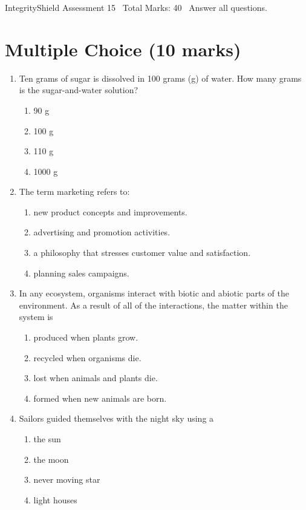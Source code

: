 \documentclass[12pt]{article}
\begin{document}
\begin{center}
IntegrityShield Assessment 15 \
Total Marks: 40 \
Answer all questions.
\end{center}

\section*{Multiple Choice (10 marks)}
\begin{enumerate}[label=\arabic*.]
\item Ten grams of sugar is dissolved in 100 grams (g) of water. How many grams is the sugar-and-water solution?
\begin{enumerate}[label=(\alph*)]
    \item 90 g
    \item 100 g
    \item 110 g
    \item 1000 g
\end{enumerate}
\item The term marketing refers to:
\begin{enumerate}[label=(\alph*)]
    \item new product concepts and improvements.
    \item advertising and promotion activities.
    \item a philosophy that stresses customer value and satisfaction.
    \item planning sales campaigns.
\end{enumerate}
\item In any ecosystem, organisms interact with biotic and abiotic parts of the environment. As a result of all of the interactions, the matter within the system is
\begin{enumerate}[label=(\alph*)]
    \item produced when plants grow.
    \item recycled when organisms die.
    \item lost when animals and plants die.
    \item formed when new animals are born.
\end{enumerate}
\item Sailors guided themselves with the night sky using a
\begin{enumerate}[label=(\alph*)]
    \item the sun
    \item the moon
    \item never moving star
    \item light houses

\end{enumerate}
\end{enumerate}
\end{document}
